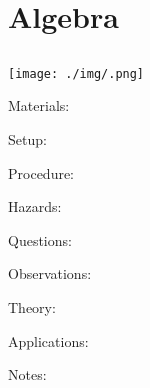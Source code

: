 \section{Algebra}

\begin{multicols}{2}


\section*{}


\subsection{}

\begin{center}
\texttt{[image: ./img/.png]}
\end{center}

\begin{description*}
\item[Materials:]{}
\item[Setup:]{}
\item[Procedure:]{}
\item[Hazards:]{}
\item[Questions:]{}
\item[Observations:]{}
\item[Theory:]{}
\item[Applications:]{}
\item[Notes:]{}
\end{description*}



\end{multicols}

\pagebreak